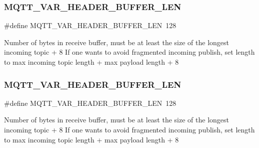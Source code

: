 \subsubsection{\texorpdfstring{M\+Q\+T\+T\+\_\+\+V\+A\+R\+\_\+\+H\+E\+A\+D\+E\+R\+\_\+\+B\+U\+F\+F\+E\+R\+\_\+\+L\+EN}{MQTT\_VAR\_HEADER\_BUFFER\_LEN}\hspace{0.1cm}{\footnotesize\ttfamily [1/2]}}
{\footnotesize\ttfamily \#define M\+Q\+T\+T\+\_\+\+V\+A\+R\+\_\+\+H\+E\+A\+D\+E\+R\+\_\+\+B\+U\+F\+F\+E\+R\+\_\+\+L\+EN~128}

Number of bytes in receive buffer, must be at least the size of the longest incoming topic + 8 If one wants to avoid fragmented incoming publish, set length to max incoming topic length + max payload length + 8 \mbox{\label{group__mqtt__opts_ga8275ef78a85fb14c3ac1423c70e45805}} 
\subsubsection{\texorpdfstring{M\+Q\+T\+T\+\_\+\+V\+A\+R\+\_\+\+H\+E\+A\+D\+E\+R\+\_\+\+B\+U\+F\+F\+E\+R\+\_\+\+L\+EN}{MQTT\_VAR\_HEADER\_BUFFER\_LEN}\hspace{0.1cm}{\footnotesize\ttfamily [2/2]}}
{\footnotesize\ttfamily \#define M\+Q\+T\+T\+\_\+\+V\+A\+R\+\_\+\+H\+E\+A\+D\+E\+R\+\_\+\+B\+U\+F\+F\+E\+R\+\_\+\+L\+EN~128}

Number of bytes in receive buffer, must be at least the size of the longest incoming topic + 8 If one wants to avoid fragmented incoming publish, set length to max incoming topic length + max payload length + 8 